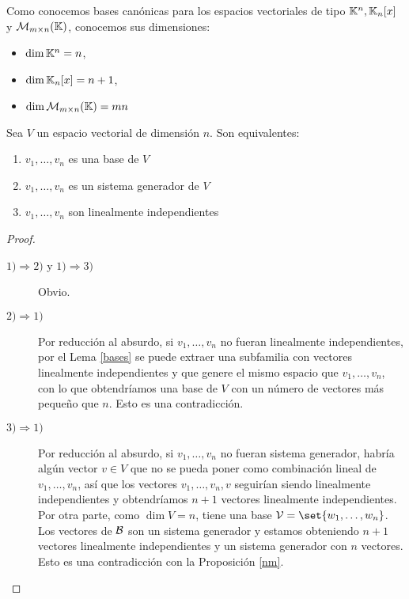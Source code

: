 Como conocemos bases canónicas para los espacios vectoriales de tipo \(\mathbb{K}^{n}, \mathbb{K}_n[x] \) y \(\mathcal{\MakeUppercase{m}}_{m \times n}(\K )\), conocemos sus dimensiones:
\begin{itemize}
	\item \(\dim \mathbb{K}^{n} = n  \),
	\item \(\dim \mathbb{K}_n [x] = n + 1 \),
	\item \(\dim \mathcal{\MakeUppercase{m}}_{m \times n}(\K) = mn \)
\end{itemize}
\begin{proposition}
	\label{base}
	Sea \(V \) un espacio vectorial de dimensión \(n \). Son equivalentes:
	\begin{enumerate}
		\item \(v_1, \ldots, v_n \) es una base de \(V \)
		\item \(v_1, \ldots, v_n \) es un sistema generador de \(V \)
		\item \(v_1, \ldots, v_n \) son linealmente independientes
	\end{enumerate}
\end{proposition}
\begin{proof}
	\begin{description}
		\item[\(1) \Rightarrow 2) \) y \(1) \Rightarrow 3) \)] Obvio.
		\item[\(2) \Rightarrow 1)\)] Por reducción al absurdo, si \(v_1, \ldots, v_n \) no fueran linealmente independientes, por el Lema \ref{bases} se puede extraer una subfamilia con vectores linealmente independientes y que genere el mismo espacio que \(v_1, \ldots, v_n \), con lo que obtendríamos una base de \(V \) con un número de vectores más pequeño que \(n \). Esto es una contradicción.
		\item[\(3) \Rightarrow 1) \)] Por reducción al absurdo, si \(v_1, \ldots, v_n \) no fueran sistema generador, habría algún vector \(v \in V \) que no se pueda poner como combinación lineal de \(v_1, \ldots, v_n \), así que los vectores \(v_1, \ldots, v_n, v \) seguirían siendo linealmente independientes y obtendríamos \(n + 1 \) vectores linealmente independientes. Por otra parte, como \(\dim V = n \), tiene una base \(\mathcal{\MakeUppercase{v}} = \set{w_1, \ldots, w_n }\). Los vectores de \(\mathcal{\MakeUppercase{b}} \) son un sistema generador y estamos obteniendo \(n + 1 \) vectores linealmente independientes y un sistema generador con \(n \) vectores. Esto es una contradicción con la Proposición \ref{nm}.
	\end{description}
\end{proof}
